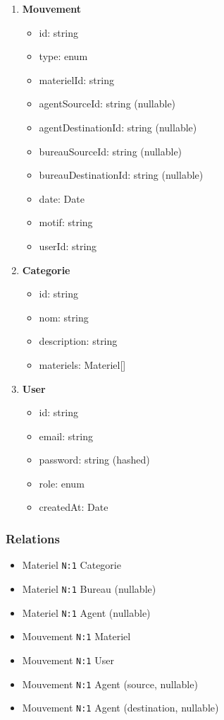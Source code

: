 \documentclass[12pt,a4paper]{report}
\begin{document}
\begin{enumerate}
    \item \textbf{Mouvement}
    \begin{itemize}
        \item id: string
        \item type: enum
        \item materielId: string
        \item agentSourceId: string (nullable)
        \item agentDestinationId: string (nullable)
        \item bureauSourceId: string (nullable)
        \item bureauDestinationId: string (nullable)
        \item date: Date
        \item motif: string
        \item userId: string
    \end{itemize}
    
    \item \textbf{Categorie}
    \begin{itemize}
        \item id: string
        \item nom: string
        \item description: string
        \item materiels: Materiel[]
    \end{itemize}
    
    \item \textbf{User}
    \begin{itemize}
        \item id: string
        \item email: string
        \item password: string (hashed)
        \item role: enum
        \item createdAt: Date
    \end{itemize}
\end{enumerate}

\subsubsection{Relations}

\begin{itemize}
    \item Materiel \texttt{N:1} Categorie
    \item Materiel \texttt{N:1} Bureau (nullable)
    \item Materiel \texttt{N:1} Agent (nullable)
    \item Mouvement \texttt{N:1} Materiel
    \item Mouvement \texttt{N:1} User
    \item Mouvement \texttt{N:1} Agent (source, nullable)
    \item Mouvement \texttt{N:1} Agent (destination, nullable)
\end{itemize}
\end{document}
